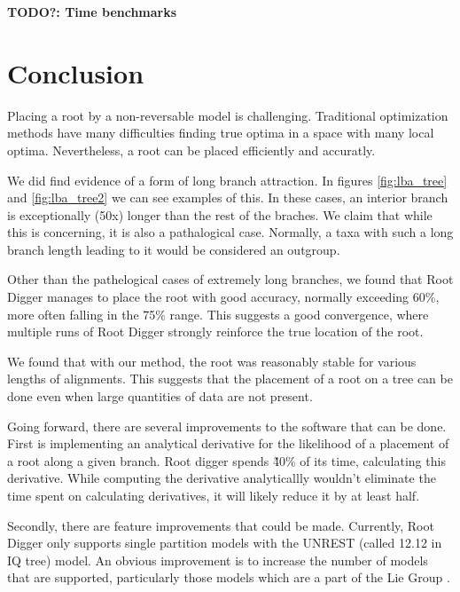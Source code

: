 \documentclass{article}
\begin{document}
\textbf{TODO?: Time benchmarks}


\section{Conclusion}

Placing a root by a non-reversable model is challenging. Traditional
optimization methods have many difficulties finding true optima in a space with
many local optima. Nevertheless, a root can be placed efficiently and accuratly.

We did find evidence of a form of long branch attraction. In figures
\ref{fig:lba_tree} and \ref{fig:lba_tree2} we can see examples of this. In these
cases, an interior branch is exceptionally (50x) longer than the rest of the
braches. We claim that while this is concerning, it is also a pathalogical case.
Normally, a taxa with such a long branch length leading to it would be
considered an outgroup.

Other than the pathelogical cases of extremely long branches, we found that Root
Digger manages to place the root with good accuracy, normally exceeding 60\%,
more often falling in the 75\% range. This suggests a good convergence, where
multiple runs of Root Digger strongly reinforce the true location of the root.

We found that with our method, the root was reasonably stable for various
lengths of alignments. This suggests that the placement of a root on a tree can
be done even when large quantities of data are not present.

Going forward, there are several improvements to the software that can be done.
First is implementing an analytical derivative for the likelihood of a placement
of a root along a given branch. Root digger spends \~ 40\% of its time,
calculating this derivative. While computing the derivative analyticallly
wouldn't eliminate the time spent on calculating derivatives, it will likely
reduce it by at least half.

Secondly, there are feature improvements that could be made. Currently, Root
Digger only supports single partition models with the UNREST (called 12.12 in IQ
tree) model. An obvious improvement is to increase the number of models that are
supported, particularly those models which are a part of the Lie Group
\cite{woodhams_new_2015}.



\end{document}
